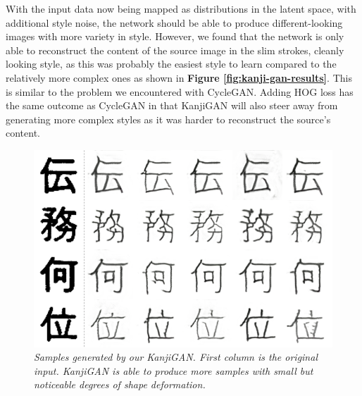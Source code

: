 \documentclass[12pt]{report}
\begin{document}
With the input data now being mapped as distributions in the latent space, with additional style noise, the network should be able to produce different-looking images with more variety in style. However, we found that the network is only able to reconstruct the content of the source image in the slim strokes, cleanly looking style, as this was probably the easiest style to learn compared to the relatively more complex ones as shown in \textbf{Figure \ref{fig:kanji-gan-results}}. This is similar to the problem we encountered with CycleGAN. Adding HOG loss has the same outcome as CycleGAN in that KanjiGAN will also steer away from generating more complex styles as it was harder to reconstruct the source's content.

\begin{figure}[H]
	\centering
	\includegraphics[scale=0.8]{kanji-gan-results-2}
	\caption{\textit{Samples generated by our KanjiGAN. First column is the original input. KanjiGAN is able to produce more samples with small but noticeable degrees of shape deformation.}}
	\label{fig:kanji-gan-results-2}
\end{figure}
\end{document}
